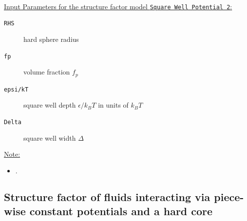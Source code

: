 ~\\
\uline{Input Parameters for the structure factor model \texttt{Square Well Potential 2}:}
\begin{description}
\item[\texttt{RHS}] hard sphere radius
\item[\texttt{fp}] volume fraction $f_p$
\item[\texttt{epsi/kT}]square well depth $\epsilon/k_BT$ in units of $k_BT$
\item[\texttt{Delta}] square well width $\Delta$
\end{description}

\noindent\uline{Note:}
\begin{itemize}
\item .
\end{itemize}

\subsection{Structure factor of fluids interacting via piece-wise constant potentials
and a hard core}~\\

